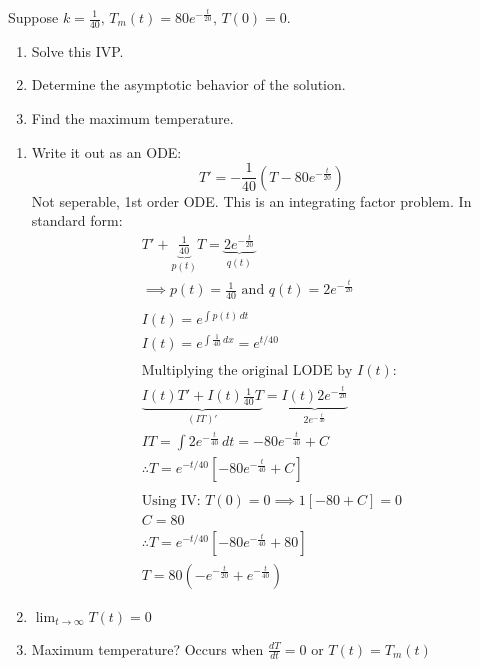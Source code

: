 \documentclass[../main.tex]{subfiles}
\begin{document}
\begin{example}[]
    Suppose \( k=\frac{1}{40},\, T_m(t)=80e^{-\frac{t}{20}},\,T(0)=0 \).
    \begin{enumerate}[label=\alph*), nolistsep]
        \item Solve this IVP.
        \item Determine the asymptotic behavior of the solution.
        \item Find the maximum temperature.
    \end{enumerate}

    \begin{enumerate}[mode=unboxed,label=\alph*)]
        \item Write it out as an ODE: \[ T'=-\frac{1}{40}(T-80e^{-\frac{t}{20}}) \]
        Not seperable, 1st order ODE. This is an integrating factor problem.
        In standard form:
        \begin{gather*}
            T' + \underbrace{\frac{1}{40}}_{p(t)} T = \underbrace{2e^{-\frac{t}{20}}}_{q(t)} \\
            \implies p(t) = \frac{1}{40} \text{ and } q(t) = 2e^{-\frac{t}{20}} \\
            \\
            I(t) = e^{\int p(t) \,dt} \\
            I(t) = e^{\int \frac{1}{40} \,dx} = e^{t/40} \\
            \\
            \text{Multiplying the original LODE by } I(t) \text{:}\\
            \underbrace{I(t)T' + I(t)\frac{1}{40}T}_{(IT)'} = \underbrace{I(t)2e^{-\frac{t}{20}}}_{2e^{-\frac{t}{40}}} \\
            IT=\int 2e^{-\frac{t}{40}} \,dt = -80e^{-\frac{t}{40}}+C \\
            \therefore T = e^{-t/40} \left[-80e^{-\frac{t}{40}}+C \right] \\
            \\
            \text{Using IV: } T(0)=0 \implies 1[-80+C]=0 \\
            C=80 \\
            \therefore T = e^{-t/40} \left[ -80e^{-\frac{t}{40}}+80 \right] \\
            \boxed{T=80\left(-e^{-\frac{t}{20}}+e^{-\frac{t}{40}}\right)}
        \end{gather*}
        \item \( \boxed{ \lim_{t\to\infty}T(t)= 0 } \)
        \item Maximum temperature? Occurs when \( \frac{dT}{dt} =0\) or \( T(t)=T_{m}(t) \)

\end{enumerate}
\end{example}
\end{document}
